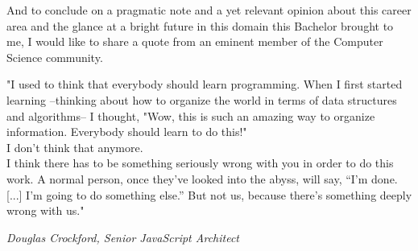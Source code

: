 And to conclude on a pragmatic note and a yet relevant opinion about this career area and the glance at a bright future in this domain this Bachelor brought to me, I would like to share a quote from an eminent member of the Computer Science community.


\epigraph{"I used to think that everybody should learn programming. When I first started learning –thinking about how to organize the world in terms of data structures and algorithms– I thought, "Wow, this is such an amazing way to organize information. Everybody should learn to do this!" \\

I don't think that anymore. \\

I think there has to be something seriously wrong with you in order to do this work. A normal person, once they’ve looked into the abyss, will say, “I’m done.[...] I’m going to do something else.” But not us, because there’s something deeply wrong with us."}{\textit{Douglas Crockford, Senior JavaScript Architect}}